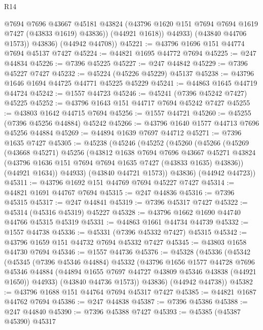 \begin{lexlean}{R14}
\begin{coremodule}
                @7694
                @7696
                @43667
                @45181
                @43824
                (@43796 @1620 @151 @7694 @7694 @1619 @7427 (@43833 @1619) @43836))
              (@44921 @1618))
            @44933)
          (@43840 @44706 @1573))
        @43836)
      (@44942 @44708))
@45221 := @43796 @1696 @151 @44774 @7694 @45137 @7427
@45224 := @44821 @1695 @44772 @7694
@45225 := @247 @44834
@45226 := @7396 @45225
@45227 := @247 @44842
@45229 := @7396 @45227 @7427
@45232 := @45224 (@45226 @45229) @45137
@45238 := @43796 @1646 @1694 @44725 @44771 @45225 @45229
@45241 := @44863 @1645 @44719 @44724
@45242 := @1557 @44723
@45246 := @45241 (@7396 @45242 @7427) @45225
@45252 := @43796 @1643 @151 @44717 @7694 @45242 @7427
@45255 := @43803 @1642 @44715 @7694
@45256 := @1557 @44721
@45260 := @45255 (@7396 @45256 @44884) @45242
@45266 := @43796 @1640 @1577 @44713 @7696 @45256 @44884
@45269 := @44894 @1639 @7697 @44712
@45271 := @7396 @1635 @7427
@45305 := @45238
    (@45246
      (@45252
        (@45260
          (@45266
            (@45269
              (@43668 @45271)
              @45256
              (@43812
                @1638
                @7694
                @7696
                @43667
                @45271
                @43824
                (@43796 @1636 @151 @7694 @7694 @1635 @7427 (@43833 @1635) @43836))
              (@44921 @1634))
            @44933)
          (@43840 @44721 @1573))
        @43836)
      (@44942 @44723))
@45311 := @43796 @1692 @151 @44769 @7694 @45227 @7427
@45314 := @44821 @1691 @44767 @7694
@45315 := @247 @44836
@45316 := @7396 @45315
@45317 := @247 @44841
@45319 := @7396 @45317 @7427
@45322 := @45314 (@45316 @45319) @45227
@45328 := @43796 @1662 @1690 @44740 @44766 @45315 @45319
@45331 := @44863 @1661 @44734 @44739
@45332 := @1557 @44738
@45336 := @45331 (@7396 @45332 @7427) @45315
@45342 := @43796 @1659 @151 @44732 @7694 @45332 @7427
@45345 := @43803 @1658 @44730 @7694
@45346 := @1557 @44736
@45376 := @45328
    (@45336
      (@45342
        (@45345
          (@7396 @45346 @44884)
          @45332
          (@43796
            @1656
            @1577
            @44728
            @7696
            @45346
            @44884
            (@44894 @1655 @7697 @44727 @43809 @45346 @43838 (@44921 @1650))
            @44933)
          (@43840 @44736 @1573))
        @43836)
      (@44942 @44738))
@45382 := @43796 @1688 @151 @44764 @7694 @45317 @7427
@45385 := @44821 @1687 @44762 @7694
@45386 := @247 @44838
@45387 := @7396 @45386
@45388 := @247 @44840
@45390 := @7396 @45388 @7427
@45393 := @45385 (@45387 @45390) @45317

\end{coremodule}
\end{lexlean}
